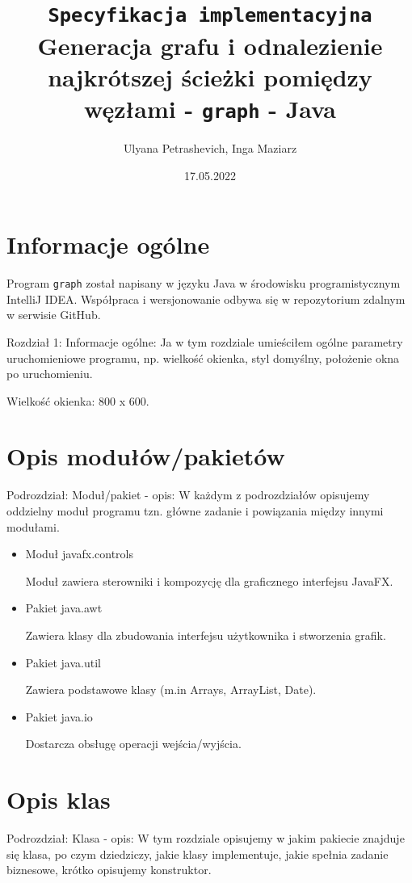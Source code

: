 \documentclass[]{article}
\title{\texttt{Specyfikacja implementacyjna}\\Generacja grafu i odnalezienie najkrótszej ścieżki pomiędzy węzłami - \texttt{graph} - Java}
\author{Ulyana Petrashevich, Inga Maziarz}
\date{17.05.2022}
\begin{document}
\maketitle
\tableofcontents
\thispagestyle{empty}
\newpage
\section{Informacje ogólne}\label{header-n231}
Program \texttt{graph} został napisany w języku Java w środowisku programistycznym IntelliJ IDEA. Współpraca i wersjonowanie odbywa się w repozytorium zdalnym w serwisie GitHub.

Rozdział 1: Informacje ogólne: Ja w tym rozdziale umieściłem ogólne parametry uruchomieniowe programu, np. wielkość okienka, styl domyślny, położenie okna po uruchomieniu.

Wielkość okienka: 800 x 600.

\section{Opis modułów/pakietów}\label{header-n233}
Podrozdział: Moduł/pakiet - opis: W każdym z podrozdziałów opisujemy oddzielny moduł programu tzn. główne zadanie i powiązania między innymi modułami.

\begin{itemize}
    \item Moduł javafx.controls
    
    Moduł zawiera sterowniki i kompozycję dla graficznego interfejsu JavaFX. 
    \item Pakiet java.awt
   
    Zawiera klasy dla zbudowania interfejsu użytkownika i stworzenia grafik.
    \item Pakiet java.util
   
    Zawiera podstawowe klasy (m.in Arrays, ArrayList, Date).
    \item Pakiet java.io
   
    Dostarcza obsługę operacji wejścia/wyjścia.
\end{itemize}

\section{Opis klas}\label{header-n233}
Podrozdział: Klasa - opis: W tym rozdziale opisujemy w jakim pakiecie znajduje się klasa, po czym dziedziczy, jakie klasy implementuje, jakie spełnia zadanie biznesowe, krótko opisujemy konstruktor.
\end{document}
